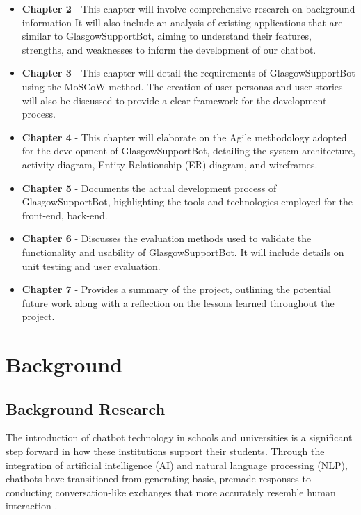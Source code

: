 \documentclass{l4proj}
\begin{document}
\begin{itemize}
    \item \textbf{Chapter 2} - This chapter will involve comprehensive research on background information  It will also include an analysis of existing applications that are similar to GlasgowSupportBot, aiming to understand their features, strengths, and weaknesses to inform the development of our chatbot.
    
    \item \textbf{Chapter 3} - This chapter will detail the requirements of GlasgowSupportBot using the MoSCoW method. The creation of user personas and user stories will also be discussed to provide a clear framework for the development process.
    
    \item \textbf{Chapter 4} - This chapter will elaborate on the Agile methodology adopted for the development of GlasgowSupportBot, detailing the system architecture, activity diagram, Entity-Relationship (ER) diagram, and wireframes.
    
    \item \textbf{Chapter 5} - Documents the actual development process of GlasgowSupportBot, highlighting the tools and technologies employed for the front-end, back-end. 
    
    \item \textbf{Chapter 6} - Discusses the evaluation methods used to validate the functionality and usability of GlasgowSupportBot. It will include details on unit testing and user evaluation.
    
    \item \textbf{Chapter 7} - Provides a summary of the project, outlining the potential future work along with a reflection on the lessons learned throughout the project.
\end{itemize}


\chapter{Background}


\section{Background Research}
The introduction of chatbot technology in schools and universities is a significant step forward in how these institutions support their students. Through the integration of artificial intelligence (AI) and natural language processing (NLP), chatbots have transitioned from generating basic, premade responses to conducting conversation-like exchanges that more accurately resemble human interaction \citep{AI}.
\end{document}
